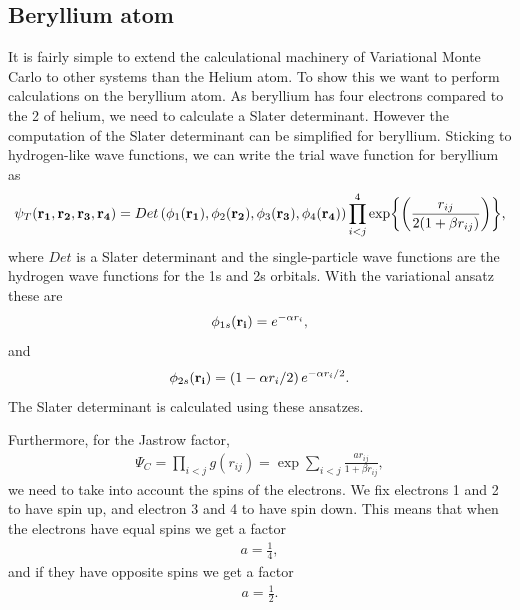 \documentclass[11pt]{article}
\begin{document}
	\subsection{Beryllium atom}

		It is fairly simple to extend the calculational machinery of Variational
		Monte Carlo to other systems than the Helium atom. To show this we
		want to perform calculations on the beryllium atom. As beryllium has
		four electrons compared to the 2 of helium, we need to calculate a
		Slater determinant. However the computation of the Slater determinant
		can be simplified for beryllium. Sticking to hydrogen-like wave functions,
		we can write the trial wave function for beryllium as
		\begin{equation}
			\psi_{T}({\bf r_{1}},{\bf r_{2}},{\bf r_{3}},{\bf r_{4}})=Det\left(\phi_{1}({\bf r_{1}}),\phi_{2}({\bf r_{2}}),\phi_{3}({\bf r_{3}}),\phi_{4}({\bf r_{4}})\right)\prod_{i<j}^{4}\exp{\left(\frac{r_{ij}}{2(1+\beta r_{ij})}\right)},
			\label{eq:BerylliumTrialFunction}
		\end{equation}
		where $Det$ is a Slater determinant and the single-particle wave
		functions are the hydrogen wave functions for the 1s and 2s orbitals.
		With the variational ansatz these are
		\begin{align}
			\phi_{1s}({\bf r_{i}})=e^{-\alpha r_{i}},
		\end{align}
		and
		\begin{align}
			\phi_{2s}({\bf r_{i}})=\left(1-\alpha r_{i}/2\right)e^{-\alpha r_{i}/2}.
		\end{align}
		The Slater determinant is calculated using these ansatzes.

		Furthermore, for the Jastrow factor,
		\begin{align}
			\Psi_{C}=\prod_{i<j}g(r_{ij})=\exp{\sum_{i<j}\frac{ar_{ij}}{1+\beta r_{ij}}},
		\end{align}
		we need to take into account the spins of the electrons. We fix electrons
		1 and 2 to have spin up, and electron 3 and 4 to have spin down. This
		means that when the electrons have equal spins we get a factor
		\begin{align}
			a=\frac{1}{4},
		\end{align}
		and if they have opposite spins we get a factor
		\begin{align}
			a=\frac{1}{2}.
		\end{align}
\end{document}
